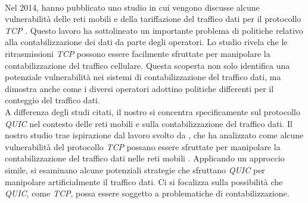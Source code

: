 \\
Nel 2014, \citeauthor{article:cellular} hanno pubblicato uno studio in cui vengono discusse alcune vulnerabilità delle reti mobili e della tariffazione del traffico dati 
per il protocollo \emph{TCP} \cite{article:cellular}. Questo lavoro ha sottolineato un importante problema di politiche relativo alla contabilizzazione dei dati da parte degli operatori.
Lo studio rivela che le ritrasmissioni \emph{TCP} possono essere facilmente sfruttate per manipolare la contabilizzazione del traffico cellulare. 
Questa scoperta non solo identifica una potenziale vulnerabilità nei sistemi di contabilizzazione del traffico dati,
ma dimostra anche come i diversi operatori adottino politiche differenti per il conteggio del traffico dati.
\\
A differenza degli studi citati, il nostro si concentra specificamente sul protocollo \emph{QUIC} nel contesto delle reti mobili e sulla contabilizzazione del traffico dati.
Il nostro studio trae ispirazione dal lavoro svolto da \citeauthor{article:cellular}, che ha analizzato 
come alcune vulnerabilità del protocollo \emph{TCP} possano essere sfruttate per manipolare la contabilizzazione del traffico dati nelle reti mobili \cite{article:cellular}.
Applicando un approccio simile, si esaminano alcune potenziali strategie che sfruttano \emph{QUIC} per manipolare artificialmente il traffico dati.
Ci si focalizza sulla possibilità che \emph{QUIC}, come \emph{TCP}, possa essere soggetto a problematiche di contabilizzazione.
